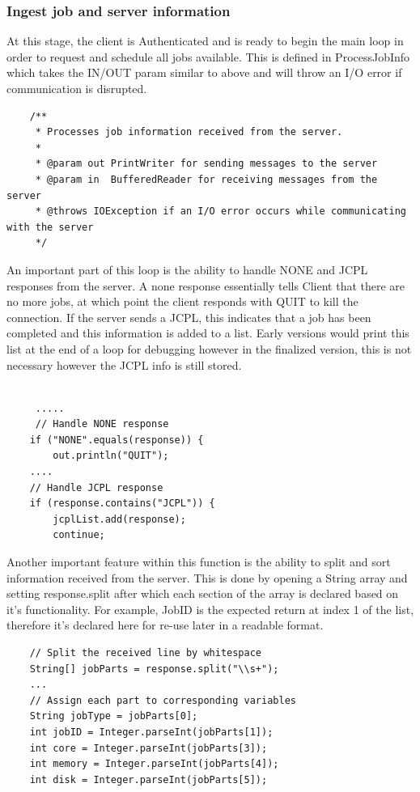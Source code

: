 \subsubsection{Ingest job and server information}
At this stage, the client is Authenticated and is ready to begin the main loop in order to request and schedule all jobs available. This is defined in ProcessJobInfo which takes the IN/OUT param similar to above and will throw an I/O error if communication is disrupted. 
\begin{lstlisting}
    /**
     * Processes job information received from the server.
     *
     * @param out PrintWriter for sending messages to the server
     * @param in  BufferedReader for receiving messages from the server
     * @throws IOException if an I/O error occurs while communicating with the server
     */
\end{lstlisting}

An important part of this loop is the ability to handle NONE and JCPL responses from the server. A none response essentially tells Client that there are no more jobs, at which point the client responds with QUIT to kill the connection. If the server sends a JCPL, this indicates that a job has been completed and this information is added to a list. Early versions would print this list at the end of a loop for debugging however in the finalized version, this is not necessary however the JCPL info is still stored.

\begin{lstlisting}

     .....
     // Handle NONE response
    if ("NONE".equals(response)) {
        out.println("QUIT");
    ....
    // Handle JCPL response
    if (response.contains("JCPL")) {
        jcplList.add(response);
        continue;
\end{lstlisting}

Another important feature within this function is the ability to split and sort information received from the server. This is done by opening a String array and setting response.split after which each section of the array is declared based on it's functionality. For example, JobID is the expected return at index 1 of the list, therefore it's declared here for re-use later in a readable format.

\begin{lstlisting}
    // Split the received line by whitespace
    String[] jobParts = response.split("\\s+");
    ...
    // Assign each part to corresponding variables
    String jobType = jobParts[0];
    int jobID = Integer.parseInt(jobParts[1]);
    int core = Integer.parseInt(jobParts[3]);
    int memory = Integer.parseInt(jobParts[4]);
    int disk = Integer.parseInt(jobParts[5]);
\end{lstlisting}


